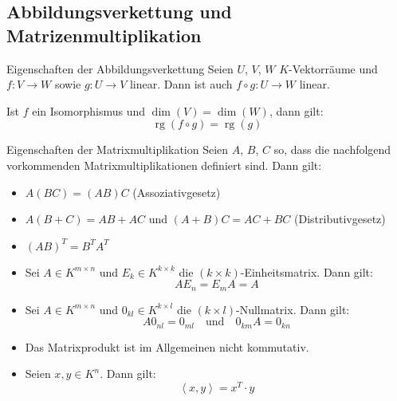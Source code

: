 \documentclass[german]{../spicker}
\newcommand{\scalarprod}[1]{\left\langle #1 \right\rangle}
\newcommand{\rg}{\operatorname{rg}}
\begin{document}
\subsection{Abbildungsverkettung und Matrizenmultiplikation}

\begin{defi}{Eigenschaften der Abbildungsverkettung}
    Seien $U$, $V$, $W$ $K$-Vektorräume und $f : V \to W$ sowie $g : U \to V$ linear.
    Dann ist auch $f \circ g : U \to W$ linear.

    Ist $f$ ein Isomorphismus und $\dim(V) = \dim(W)$, dann gilt:
    $$
        \rg(f\circ g) = \rg(g)
    $$
\end{defi}

\begin{defi}{Eigenschaften der Matrixmultiplikation}
    Seien $A$, $B$, $C$ so, dass die nachfolgend vorkommenden Matrixmultiplikationen definiert sind.
    Dann gilt:
    \begin{itemize}
        \item $A(BC) = (AB)C$ (Assoziativgesetz)
        \item $A(B+C) = AB+AC$ und $(A+B)C = AC+BC$ (Distributivgesetz)
        \item $(AB)^T = B^TA^T$
        \item Sei $A \in K^{m\times n}$ und $E_k \in K^{k\times k}$ die $(k\times k)$-Einheitsmatrix. Dann gilt:
              $$
                  AE_n = E_mA = A
              $$
        \item Sei $A \in K^{m\times n}$ und $0_{kl} \in K^{k\times l}$ die $(k\times l)$-Nullmatrix. Dann gilt:
              $$
                  A0_{nl} = 0_{ml} \quad \text{und} \quad 0_{km}A = 0_{kn}
              $$
        \item Das Matrixprodukt ist im Allgemeinen nicht kommutativ.
        \item Seien $x, y \in K^n$. Dann gilt:
              $$
                  \scalarprod{x, y} = x^T \cdot y
              $$
    \end{itemize}
\end{defi}
\end{document}
